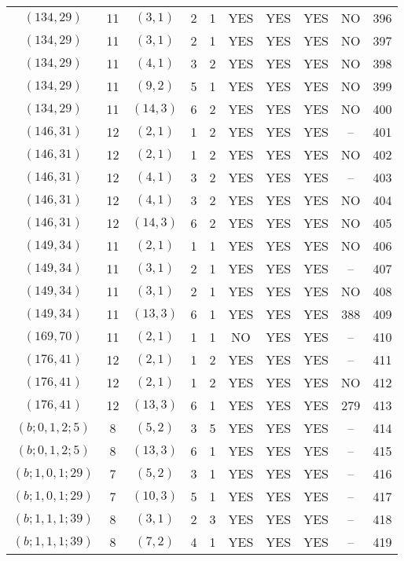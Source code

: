 \begin{longtable}{|c|c|c|c|c|c|c|c|c|c|}
$(134, 29)$ & 11 & $(3, 1)$ & 2 & 1 & YES & YES & YES & NO & 396\\
$(134, 29)$ & 11 & $(3, 1)$ & 2 & 1 & YES & YES & YES & NO & 397\\
$(134, 29)$ & 11 & $(4, 1)$ & 3 & 2 & YES & YES & YES & NO & 398\\
$(134, 29)$ & 11 & $(9, 2)$ & 5 & 1 & YES & YES & YES & NO & 399\\
$(134, 29)$ & 11 & $(14, 3)$ & 6 & 2 & YES & YES & YES & NO & 400\\
$(146, 31)$ & 12 & $(2, 1)$ & 1 & 2 & YES & YES & YES & -- & 401\\
$(146, 31)$ & 12 & $(2, 1)$ & 1 & 2 & YES & YES & YES & NO & 402\\
$(146, 31)$ & 12 & $(4, 1)$ & 3 & 2 & YES & YES & YES & -- & 403\\
$(146, 31)$ & 12 & $(4, 1)$ & 3 & 2 & YES & YES & YES & NO & 404\\
$(146, 31)$ & 12 & $(14, 3)$ & 6 & 2 & YES & YES & YES & NO & 405\\
$(149, 34)$ & 11 & $(2, 1)$ & 1 & 1 & YES & YES & YES & NO & 406\\
$(149, 34)$ & 11 & $(3, 1)$ & 2 & 1 & YES & YES & YES & -- & 407\\
$(149, 34)$ & 11 & $(3, 1)$ & 2 & 1 & YES & YES & YES & NO & 408\\
$(149, 34)$ & 11 & $(13, 3)$ & 6 & 1 & YES & YES & YES & 388 & 409\\
$(169, 70)$ & 11 & $(2, 1)$ & 1 & 1 & NO & YES & YES & -- & 410\\
$(176, 41)$ & 12 & $(2, 1)$ & 1 & 2 & YES & YES & YES & -- & 411\\
$(176, 41)$ & 12 & $(2, 1)$ & 1 & 2 & YES & YES & YES & NO & 412\\
$(176, 41)$ & 12 & $(13, 3)$ & 6 & 1 & YES & YES & YES & 279 & 413\\
$(b; 0, 1, 2; 5)$ & 8 & $(5, 2)$ & 3 & 5 & YES & YES & YES & -- & 414\\
$(b; 0, 1, 2; 5)$ & 8 & $(13, 3)$ & 6 & 1 & YES & YES & YES & -- & 415\\
$(b; 1, 0, 1; 29)$ & 7 & $(5, 2)$ & 3 & 1 & YES & YES & YES & -- & 416\\
$(b; 1, 0, 1; 29)$ & 7 & $(10, 3)$ & 5 & 1 & YES & YES & YES & -- & 417\\
$(b; 1, 1, 1; 39)$ & 8 & $(3, 1)$ & 2 & 3 & YES & YES & YES & -- & 418\\
$(b; 1, 1, 1; 39)$ & 8 & $(7, 2)$ & 4 & 1 & YES & YES & YES & -- & 419\\

\end{longtable}
